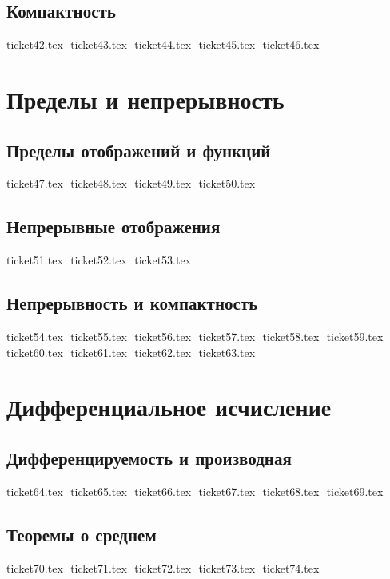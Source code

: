 \section{Компактность}
{ticket42.tex}
$ $
{ticket43.tex}
$ $
{ticket44.tex}
$ $
{ticket45.tex}
$ $
{ticket46.tex}
$ $

\chapter{Пределы и непрерывность}
\section{Пределы отображений и функций}
{ticket47.tex}
$ $
{ticket48.tex}
$ $
{ticket49.tex}
$ $
{ticket50.tex}
$ $

\section{Непрерывные отображения}
{ticket51.tex}
$ $
{ticket52.tex}
$ $
{ticket53.tex}
$ $

\section{Непрерывность и компактность}
{ticket54.tex}
$ $
{ticket55.tex}
$ $
{ticket56.tex}
$ $
{ticket57.tex}
$ $
{ticket58.tex}
$ $
{ticket59.tex}
$ $
{ticket60.tex}
$ $
{ticket61.tex}
$ $
{ticket62.tex}
$ $
{ticket63.tex}
$ $

\chapter{Дифференциальное исчисление}
\section{Дифференцируемость и производная}
{ticket64.tex}
$ $
{ticket65.tex}
$ $
{ticket66.tex}
$ $
{ticket67.tex}
$ $
{ticket68.tex}
$ $
{ticket69.tex}
$ $

\section{Теоремы о среднем}
{ticket70.tex}
$ $
{ticket71.tex}
$ $
{ticket72.tex}
$ $
{ticket73.tex}
$ $
{ticket74.tex}
$ $

